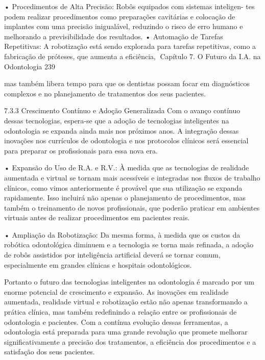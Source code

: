     • Procedimentos de Alta Precisão: Robôs equipados com sistemas inteligen-
      tes podem realizar procedimentos como preparações cavitárias e colocação de
      implantes com uma precisão inigualável, reduzindo o risco de erro humano e
      melhorando a previsibilidade dos resultados.
    • Automação de Tarefas Repetitivas: A robotização está sendo explorada para
      tarefas repetitivas, como a fabricação de próteses, que aumenta a eficiência,
Capítulo 7. O Futuro da I.A. na Odontologia                                            239


      mas também libera tempo para que os dentistas possam focar em diagnósticos
      complexos e no planejamento de tratamentos dos seus pacientes.

7.3.3     Crescimento Contínuo e Adoção Generalizada
Com o avanço contínuo dessas tecnologias, espera-se que a adoção de tecnologias
inteligentes na odontologia se expanda ainda mais nos próximos anos. A integração
dessas inovações nos currículos de odontologia e nos protocolos clínicos será essencial
para preparar os profissionais para essa nova era.

    • Expansão do Uso de R.A. e R.V.: À medida que as tecnologias de realidade
      aumentada e virtual se tornam mais acessíveis e integradas nos fluxos de trabalho
      clínicos, como vimos anteriormente é provável que sua utilização se expanda
      rapidamente. Isso incluirá não apenas o planejamento de procedimentos, mas
      também o treinamento de novos profissionais, que poderão praticar em ambientes
      virtuais antes de realizar procedimentos em pacientes reais.

    • Ampliação da Robotização: Da mesma forma, à medida que os custos da
      robótica odontológica diminuem e a tecnologia se torna mais refinada, a adoção de
      robôs assistidos por inteligência artificial deverá se tornar comum, especialmente
      em grandes clínicas e hospitais odontológicos.

         Portanto o futuro das tecnologias inteligentes na odontologia é marcado por um
enorme potencial de crescimento e expansão. As inovações em realidade aumentada,
realidade virtual e robotização estão não apenas transformando a prática clínica, mas
também redefinindo a relação entre os profissionais de odontologia e pacientes. Com
a contínua evolução dessas ferramentas, a odontologia está preparada para uma
grande revolução que promete melhorar significativamente a precisão dos tratamentos,
a eficiência dos procedimentos e a satisfação dos seus pacientes.


